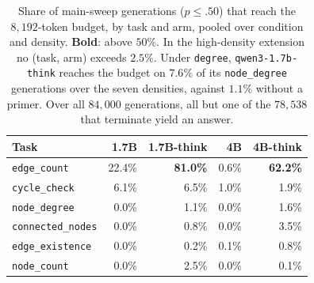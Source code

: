 \documentclass[11pt]{article}
\begin{document}
\begin{table}[H]
\centering
\small
\setlength{\tabcolsep}{3pt}
\begin{tabular}{lrrrr}
\toprule
Task & 1.7B & 1.7B-think & 4B & 4B-think \\
\midrule
\texttt{edge\_count}     & 22.4\% & \textbf{81.0\%} & 0.6\% & \textbf{62.2\%} \\
\texttt{cycle\_check}    & 6.1\%  & 6.5\%  & 1.0\%  & 1.9\% \\
\texttt{node\_degree}    & 0.0\%  & 1.1\%  & 0.0\%  & 1.6\% \\
\texttt{connected\_nodes}& 0.0\%  & 0.8\%  & 0.0\%  & 3.5\% \\
\texttt{edge\_existence} & 0.0\%  & 0.2\%  & 0.1\%  & 0.8\% \\
\texttt{node\_count}     & 0.0\%  & 2.5\%  & 0.0\%  & 0.1\% \\
\bottomrule
\end{tabular}
\caption{Share of main-sweep generations ($p\le.50$) that reach the
$8{,}192$-token budget, by task and arm, pooled over condition and density.
\textbf{Bold}: above $50\%$. In the high-density extension no (task, arm)
exceeds $2.5\%$. Under \texttt{degree}, \texttt{qwen3-1.7b-think} reaches the
budget on $7.6\%$ of its \texttt{node\_degree} generations over the seven
densities, against $1.1\%$ without a primer. Over all $84{,}000$ generations,
all but one of the $78{,}538$ that terminate yield an answer.}
\label{tab:hitcap}
\end{table}
\end{document}
